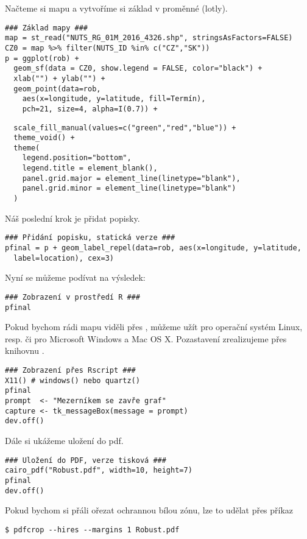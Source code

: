 Načteme si mapu a vytvoříme si základ v proměnné (lotly).

\begin{lstlisting}
### Základ mapy ###
map = st_read("NUTS_RG_01M_2016_4326.shp", stringsAsFactors=FALSE)
CZ0 = map %>% filter(NUTS_ID %in% c("CZ","SK"))
p = ggplot(rob) +
  geom_sf(data = CZ0, show.legend = FALSE, color="black") +
  xlab("") + ylab("") +
  geom_point(data=rob, 
    aes(x=longitude, y=latitude, fill=Termín),
    pch=21, size=4, alpha=I(0.7)) +
\end{lstlisting}

\newpage
\begin{lstlisting}    
  scale_fill_manual(values=c("green","red","blue")) +
  theme_void() +
  theme(
    legend.position="bottom",
    legend.title = element_blank(),
    panel.grid.major = element_line(linetype="blank"),
    panel.grid.minor = element_line(linetype="blank")
  ) 
\end{lstlisting}

Náš poslední krok je přidat popisky.
\begin{lstlisting}
### Přidání popisku, statická verze ###
pfinal = p + geom_label_repel(data=rob, aes(x=longitude, y=latitude, 
  label=location), cex=3)
\end{lstlisting}

Nyní se můžeme podívat na výsledek:
\begin{lstlisting}
### Zobrazení v prostředí R ###
pfinal 
\end{lstlisting}

Pokud bychom rádi mapu viděli přes , můžeme užít  pro operační systém Linux, resp.  či  pro Microsoft Windows a Mac OS X. Pozastavení zrealizujeme přes knihovnu .
\begin{lstlisting}
### Zobrazení přes Rscript ###
X11() # windows() nebo quartz()
pfinal
prompt  <- "Mezerníkem se zavře graf"
capture <- tk_messageBox(message = prompt)
dev.off()
\end{lstlisting}

Dále si ukážeme uložení do pdf.
\begin{lstlisting}
### Uložení do PDF, verze tisková ###
cairo_pdf("Robust.pdf", width=10, height=7)
pfinal
dev.off()
\end{lstlisting}

Pokud bychom si přáli ořezat ochrannou bílou zónu, lze to udělat přes příkaz 
\begin{lstlisting}[numbers=none]
$ pdfcrop --hires --margins 1 Robust.pdf
\end{lstlisting}
\addtocounter{lstnumber}{-1}

